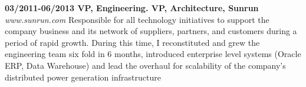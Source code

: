 \documentclass{res}
\begin{document}
\begin{resume}
{\bf 03/2011-06/2013 VP, Engineering. VP, Architecture, Sunrun}
{\it www.sunrun.com} Responsible for all technology initiatives to support the company business and its network of suppliers, partners, and customers during a period of rapid growth. During this time, I reconstituted and grew the engineering team six fold in 6 months, introduced enterprise level systems (Oracle ERP, Data Warehouse) and lead the overhaul for scalability of the company's distributed power generation infrastructure 

\begin{comment}
\begin{itemize}
    \item Reconstituted the engineering team, growing it from 10 to ~60 engineers in the first 9 months.
    \item Upgraded the financial infrastructure of the company from Quickbooks to Oracle EBS R12.
    \item Delivered a Data analytics platform for the company that integrates all sources of data in an enterprise Data Warehouse.
    \item Stabilized existing systems (Lead-to-Quote systems, Billing, Monitoring) that allowed the company to double its customer base in 12 months.
    \item Developed from scratch an industry leading Solar PV System Design Tool.
    \item Delivered new, scalable Customer and Corporate websites integrated with the company back office systems.
    \item Re-architected the core systems of the company to scale to up to 10x the number of customers to support the growth targets of the company (under current implementation).
    \item Developed a financial modeling package in Python for direct use by financial analyst that reduces analysis time by a factor of 10-50 w.r.t. Excel.
\end{itemize}
\end{comment}


\end{resume}
\end{document}
